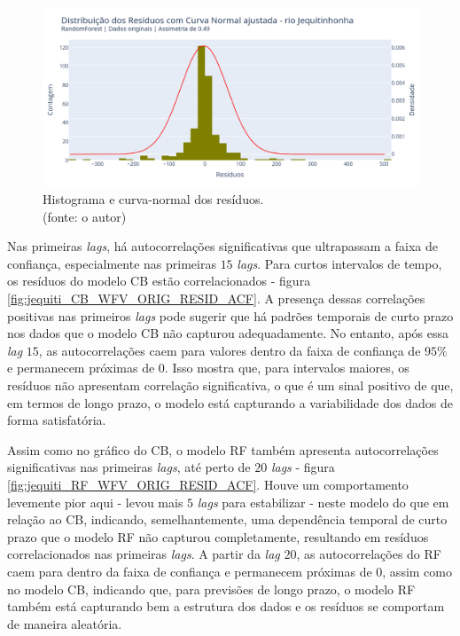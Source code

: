 \begin{figure}[!h]
\centering
\includegraphics[scale=0.33]{Figuras/jequiti/wfv/RF/RF_WFV_ORIG_RESID_x_CURVA_NORMAL.png}
\caption{Histograma e curva-normal dos resíduos.\\(fonte: o autor)}
\label{fig:jequiti_RF_WFV_ORIG_RESID_x_CURVA_NORMAL}
\end{figure}
\clearpage

Nas primeiras \textit{lags}, há autocorrelações significativas que ultrapassam a faixa de confiança, especialmente nas primeiras $15$ \textit{lags}. Para curtos intervalos de tempo, os resíduos do modelo CB estão correlacionados - figura \ref{fig:jequiti_CB_WFV_ORIG_RESID_ACF}. A presença dessas correlações positivas nas primeiros \textit{lags} pode sugerir que há padrões temporais de curto prazo nos dados que o modelo CB não capturou adequadamente. No entanto, após essa \textit{lag} $15$, as autocorrelações caem para valores dentro da faixa de confiança de $95\%$ e permanecem próximas de $0$. Isso mostra que, para intervalos maiores, os resíduos não apresentam correlação significativa, o que é um sinal positivo de que, em termos de longo prazo, o modelo está capturando a variabilidade dos dados de forma satisfatória.

Assim como no gráfico do CB, o modelo RF também apresenta autocorrelações significativas nas primeiras \textit{lags}, até perto de $20$ \textit{lags} - figura \ref{fig:jequiti_RF_WFV_ORIG_RESID_ACF}. Houve um comportamento levemente pior aqui - levou mais $5$ \textit{lags} para estabilizar - neste modelo do que em relação ao CB, indicando, semelhantemente, uma dependência temporal de curto prazo que o modelo RF não capturou completamente, resultando em resíduos correlacionados nas primeiras \textit{lags}. A partir da \textit{lag} $20$, as autocorrelações do RF caem para dentro da faixa de confiança e permanecem próximas de $0$, assim como no modelo CB, indicando que, para previsões de longo prazo, o modelo RF também está capturando bem a estrutura dos dados e os resíduos se comportam de maneira aleatória.


